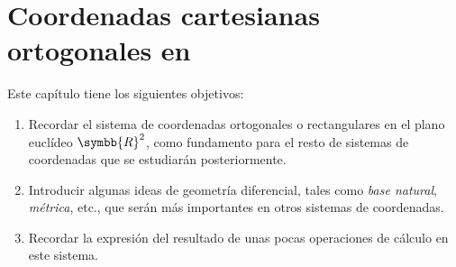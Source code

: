 %


\chapter{Coordenadas cartesianas ortogonales en\/
  }
Este capítulo tiene los siguientes objetivos:
\begin{enumerate}
\item Recordar el sistema de coordenadas ortogonales o rectangulares en el
  plano euclídeo $\symbb{R}^2$, como fundamento para el resto de sistemas de
  coordenadas que se estudiarán posteriormente.
\item Introducir algunas ideas de geometría diferencial, tales como
  \emph{base natural}, \emph{métrica}, etc., que serán más importantes en otros
  sistemas de coordenadas.
\item Recordar la expresión del resultado de unas pocas operaciones de cálculo en
  este sistema.
\end{enumerate}


